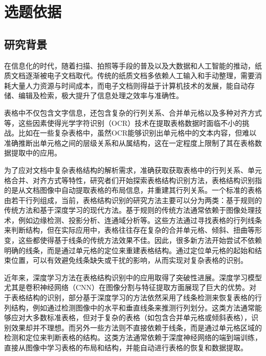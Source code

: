 \documentclass[UTF8,12pt, AutoFakeBold,fontset = founder]{ctexart}
\begin{document}
\setcounter{page}{1} %
\section{选题依据}

\subsection{研究背景}

在信息化的时代，随着扫描、拍照等手段的普及以及大数据和人工智能的推动，纸质文档逐渐被电子文档取代。传统的纸质文档多依赖人工输入和手动整理，需要消耗大量人力资源与时间成本，而电子文档则得益于计算机技术的发展，能自动存储、编辑及检索，极大提升了信息处理之效率与准确性。

表格中不仅包含文字信息，还包含复杂的行列关系、合并单元格以及多种对齐方式等，这些因素使得光学字符识别（OCR）\cite{b1, b2}技术在提取表格数据时面临不小的挑战。比如在一些复杂表格中，虽然OCR能够识别出单元格中的文本内容，但难以准确推断出单元格之间的层级关系和从属结构，这在一定程度上限制了其在表格数据提取中的应用。

为了应对文档中复杂表格结构的解析需求，准确获取获取表格中的行列关系、单元格合并、对齐方式等特性，研究者们开始探索表格结构识别方法，表格结构识别指的是从文档图像中自动提取表格的布局信息，并重建其行列关系。一个标准的表格由若干行列组成，当前，表格结构识别的研究方法主要可以分为两类：基于规则的传统方法和基于深度学习的现代方法。基于规则的传统方法通常依赖于图像处理技术，例如边缘检测、投影分析、连通域分析等\cite{b3}。这些方法通过寻找表格的行列线条来判断结构，但在实际应用中，表格往往存在复杂的合并单元格、倾斜、扭曲等形变，这些都使得基于线条的传统方法效果不佳。因此，很多新方法开始尝试不依赖明确的线条，而是通过单元格的定位来重建表格结构。通过定位单元格的起始和结束位置，可以有效避免线条缺失或干扰的影响，从而实现对复杂表格的识别。

近年来，深度学习方法在表格结构识别中的应用取得了突破性进展\cite{b3}。深度学习模型尤其是卷积神经网络（CNN）在图像分割与特征提取方面展现了巨大的优势。对于表格结构的识别，部分基于深度学习的方法依然采用了线条检测来恢复表格的行列结构，例如通过检测图像中的水平和垂直线条来推测行列划分。这类方法通常能够应对大多数标准表格，但对于复杂的表格（如包含合并单元格或倾斜表格），识别效果却并不理想。而另外一些方法则不直接依赖于线条，而是通过单元格区域的检测和定位来判断表格的结构\cite{bcell}。这类方法通常依赖于深度神经网络的端到端训练，直接从图像中学习表格的布局和结构，并能自动进行表格的恢复和数据提取。
\end{document}
